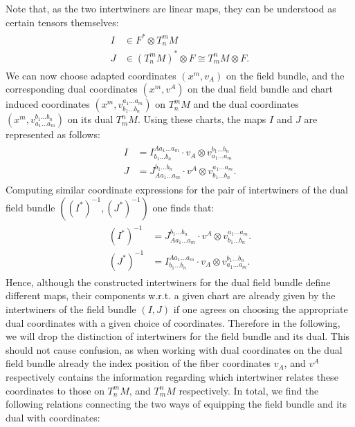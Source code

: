 Note that, as the two intertwiners are linear maps, they can be understood as certain tensors themselves: 
\begin{align}
\begin{aligned}
I &\in F^{\ast} \otimes T^m_n M\\
J &\in (T^m_nM)^{\ast} \otimes F \cong T^n_m M \otimes F.
\end{aligned}
\end{align}
We can now choose adapted coordinates $(x^m,v_A)$ on the field bundle, and the corresponding dual coordinates $(x^m, v^A)$ on the dual field bundle and chart induced coordinates $(x^m, v^{a_1 ... a_m}_{b_1 ... b_n})$ on $T^m_n M$ and the dual coordinates $(x^m, v^{b_1 ... b_n}_{a_1 ... a_m})$ on its dual $T^n_mM$. Using these charts, the maps $I$ and $J$ are represented as follows:
\begin{align} \label{interAbs}
    \begin{aligned}
    I &= I^{A a_1 ... a_m}_{b_1 ... b_n} \cdot v_A \otimes  v^{b_1 ... b_n}_{a_1 ... a_m}\\
    J &= J^{b_1 ... b_n}_{A a_1 ... a_m} \cdot v^A \otimes  v^{a_1 ... a_m}_{b_1 ... b_n}.
    \end{aligned}
\end{align}
Computing similar coordinate expressions for the pair of intertwiners of the dual field bundle $((I^{\ast})^{-1}, (J^{\ast})^{-1})$ one finds that:
\begin{align} \label{dualInterAbs}
    \begin{aligned}
         (I^{\ast})^{-1} &= J^{b_1 ... b_n}_{A a_1 ... a_m} \cdot v^A \otimes  v^{a_1 ... a_m}_{b_1 ... b_n}.\\
         (J^{\ast})^{-1} &= I^{A a_1 ... a_m}_{b_1 ... b_n} \cdot v_A \otimes  v^{b_1 ... b_n}_{a_1 ... a_m}.
    \end{aligned}
\end{align} 
Hence, although the constructed intertwiners for the dual field bundle define different maps, their components w.r.t. a given chart are already given by the intertwiners of the field bundle $(I,J)$ if one agrees on choosing the appropriate dual coordinates with a given choice of coordinates. Therefore in the following, we will drop the distinction of intertwiners for the field bundle and its dual.  This should not cause confusion, as when working with dual coordinates on the dual field bundle already the index position of the fiber coordinates $v_A$, and $v^{A}$ respectively contains the information regarding which intertwiner relates these coordinates to those on $T^m_n M$, and $T^n_mM$ respectively. In total, we find the following relations connecting the two ways of equipping the field bundle and its dual with coordinates: 
